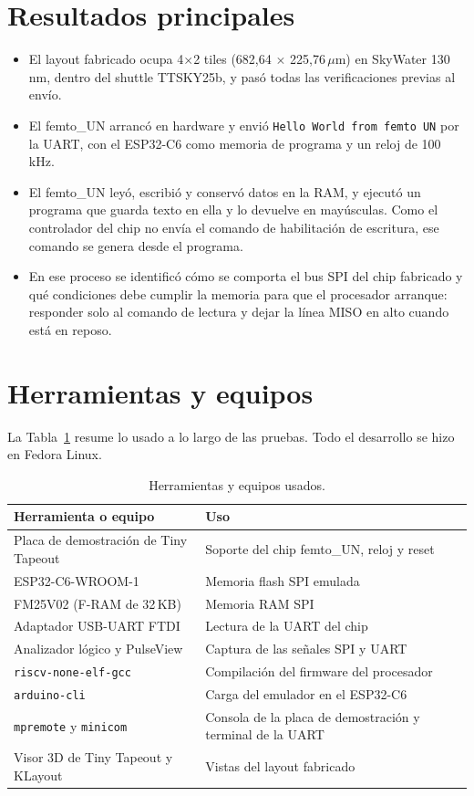\documentclass[11pt,letterpaper,oneside]{report}
\newcommand{\um}{\ensuremath{\mu}m}
\newcommand{\code}[1]{\texttt{#1}}
\begin{document}
\section{Resultados principales}

\begin{itemize}
  \item El layout fabricado ocupa 4$\times$2 tiles (682,64 $\times$ 225,76\,\um) en SkyWater 130\,nm, dentro del shuttle TTSKY25b, y pasó todas las verificaciones previas al envío.
  \item El femto\_UN arrancó en hardware y envió \code{Hello World from femto UN} por la UART, con el ESP32-C6 como memoria de programa y un reloj de 100\,kHz.
  \item El femto\_UN leyó, escribió y conservó datos en la RAM, y ejecutó un programa que guarda texto en ella y lo devuelve en mayúsculas. Como el controlador del chip no envía el comando de habilitación de escritura, ese comando se genera desde el programa.
  \item En ese proceso se identificó cómo se comporta el bus SPI del chip fabricado y qué condiciones debe cumplir la memoria para que el procesador arranque: responder solo al comando de lectura y dejar la línea MISO en alto cuando está en reposo.
\end{itemize}

\section{Herramientas y equipos}

La Tabla~\ref{tab:herramientas} resume lo usado a lo largo de las pruebas. Todo el desarrollo se hizo en Fedora Linux.

\begin{table}[htbp]
\centering
\caption{Herramientas y equipos usados.}
\label{tab:herramientas}
\begin{tabular}{>{\raggedright\arraybackslash}p{6.2cm} >{\raggedright\arraybackslash}p{8.4cm}}
\toprule
\textbf{Herramienta o equipo} & \textbf{Uso} \\
\midrule
Placa de demostración de Tiny Tapeout & Soporte del chip femto\_UN, reloj y reset \\
ESP32-C6-WROOM-1 & Memoria flash SPI emulada \\
FM25V02 (F-RAM de 32\,KB) & Memoria RAM SPI \\
Adaptador USB-UART FTDI & Lectura de la UART del chip \\
Analizador lógico y PulseView & Captura de las señales SPI y UART \\
\code{riscv-none-elf-gcc} & Compilación del firmware del procesador \\
\code{arduino-cli} & Carga del emulador en el ESP32-C6 \\
\code{mpremote} y \code{minicom} & Consola de la placa de demostración y terminal de la UART \\
Visor 3D de Tiny Tapeout y KLayout & Vistas del layout fabricado \\
\bottomrule
\end{tabular}
\end{table}
\end{document}

